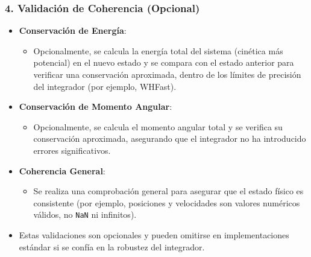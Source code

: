 \subsubsection*{4. Validación de Coherencia (Opcional)}
\begin{itemize}
    \item \textbf{Conservación de Energía}:
    \begin{itemize}
        \item Opcionalmente, se calcula la energía total del sistema (cinética más potencial) en el nuevo estado y se compara con el estado anterior para verificar una conservación aproximada, dentro de los límites de precisión del integrador (por ejemplo, WHFast).
    \end{itemize}
    \item \textbf{Conservación de Momento Angular}:
    \begin{itemize}
        \item Opcionalmente, se calcula el momento angular total y se verifica su conservación aproximada, asegurando que el integrador no ha introducido errores significativos.
    \end{itemize}
    \item \textbf{Coherencia General}:
    \begin{itemize}
        \item Se realiza una comprobación general para asegurar que el estado físico es consistente (por ejemplo, posiciones y velocidades son valores numéricos válidos, no \texttt{NaN} ni infinitos).
    \end{itemize}
    \item Estas validaciones son opcionales y pueden omitirse en implementaciones estándar si se confía en la robustez del integrador.
\end{itemize}

